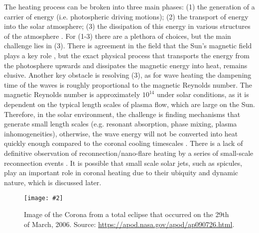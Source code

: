 \documentclass[12pt]{ociamthesis}
\newcommand{\mfig}[4]{
  \begin{figure}
  \begin{center}
  \texttt{[image: \#2]}
  \caption{#3}
  \label{#4}
  \end{center}
  \end{figure}}
\begin{document}
%
The heating process can be broken into three main phases: (1) the generation of a carrier of energy (i.e. photospheric driving motions); (2) the transport of energy into the solar atmosphere; (3) the dissipation of this energy in various structures of the atmosphere \citep{Wentzel1974SoPh39129W, Robert2004AG45d34E}. For (1-3) there are a plethora of choices, but the main challenge lies in (3). There is agreement in the field that the Sun's magnetic field plays a key role \citep{Parnell2012RSPTA3703217P, Arregui2015RSPTA37340261A}, but the exact physical process that transports the energy from the photosphere upwards and dissipates the magnetic energy into heat, remains elusive. Another key obstacle is resolving (3), as for wave heating the dampening time of the waves is roughly proportional to the magnetic Reynolds number. The magnetic Reynolds number is approximately  $10^{14}$ under solar conditions, as it is dependent on the typical length scales of plasma flow, which are large on the Sun. Therefore, in the solar environment, the challenge is finding mechanisms that generate small length scales (e.g. resonant absorption, phase mixing, plasma inhomogeneities), otherwise, the wave energy will not be converted into heat quickly enough compared to the coronal cooling timescales \citep{Doorsselaere2020SSRv216140V}. There is a lack of definitive observation of reconnection/nano-flare heating by a series of small-scale reconnection events \citep{Hudson1991SoPh133357H, Parnell2012RSPTA3703217P}. It is possible that small scale solar jets, such as spicules, play an important role in coronal heating due to their ubiquity and dynamic nature, which is discussed later.
\mfig{0.65}{figures/corona_vangorp.png}{Image of the Corona from a total eclipse that occurred on the 29th of March, 2006. Source: \url{https://apod.nasa.gov/apod/ap090726.html}.}{corona_image}
\end{document}
